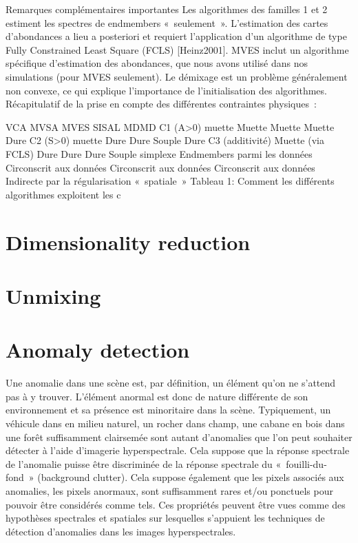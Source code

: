 Remarques complémentaires importantes
Les algorithmes des familles 1 et 2 estiment les spectres de endmembers « seulement ». L’estimation des cartes d’abondances a lieu a posteriori et requiert l’application d’un algorithme de type Fully Constrained Least Square (FCLS) [Heinz2001]. MVES inclut un algorithme spécifique d’estimation des abondances, que nous avons utilisé dans nos simulations (pour MVES seulement).
Le démixage est un problème généralement non convexe, ce qui explique l’importance de l’initialisation des algorithmes.
Récapitulatif de la prise en compte des différentes contraintes physiques :

VCA
MVSA
MVES
SISAL
MDMD
C1 (A>0)
muette
Muette
Muette
Muette
Dure
C2 (S>0)
muette
Dure
Dure
Souple
Dure
C3 (additivité)
Muette (via FCLS)
Dure
Dure
Dure
Souple
simplexe
Endmembers parmi les données
Circonscrit aux données
Circonscrit aux données
Circonscrit aux données
Indirecte par la régularisation « spatiale »
Tableau 1: Comment les différents algorithmes exploitent les c
\section{Dimensionality reduction}
\section{Unmixing}
\section{Anomaly detection}
Une anomalie dans une scène est, par définition, un élément qu’on ne s’attend pas à y trouver. L’élément anormal est donc de nature différente de son environnement et sa présence est minoritaire dans la scène. Typiquement, un véhicule dans en milieu naturel, un rocher dans champ, une cabane en bois dans une forêt suffisamment clairsemée sont autant d’anomalies que l’on peut souhaiter détecter à l’aide d’imagerie hyperspectrale. Cela suppose que la réponse spectrale de l’anomalie puisse être discriminée de la réponse spectrale du « fouilli-du-fond » (background clutter). Cela suppose également que les pixels associés aux anomalies, les pixels anormaux, sont suffisamment rares et/ou ponctuels pour pouvoir être considérés comme tels. Ces propriétés peuvent être vues comme des hypothèses spectrales et spatiales sur lesquelles s’appuient les techniques de détection d’anomalies dans les images hyperspectrales.

